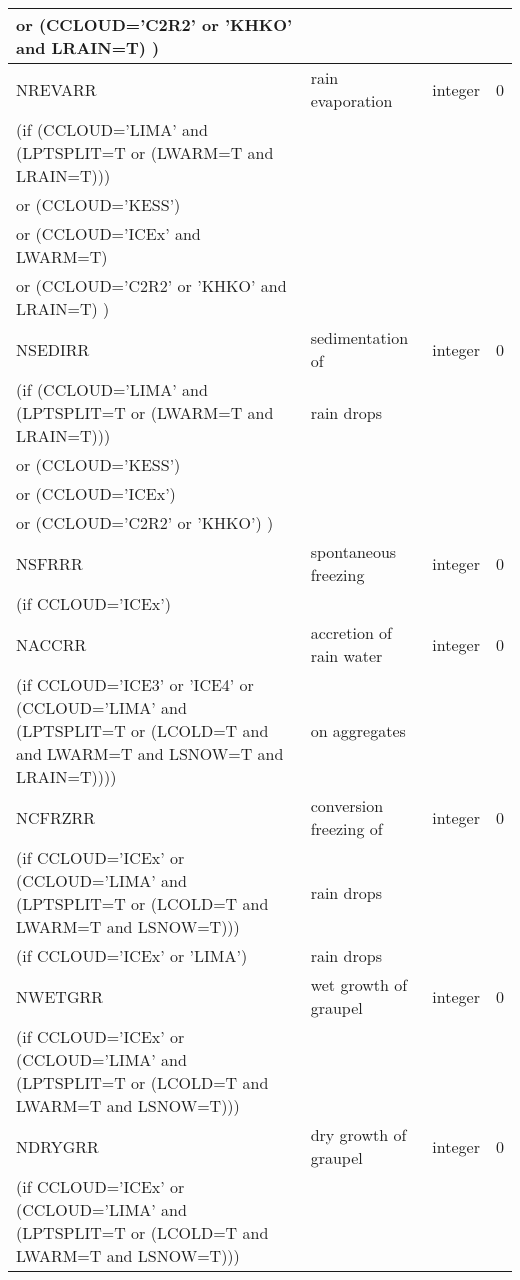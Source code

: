 \begin{longtable} {|p{}|p{}|>{\centering}p{}|p{}<{\centering}|}
 or (CCLOUD='C2R2' or 'KHKO' and LRAIN=T) ) & & & \\ \hline
NREVARR & rain evaporation  & integer  &  0 \index{NREVARR!\innam{NAM\_BU\_RRR}}\\\hline
(if (CCLOUD='LIMA' and (LPTSPLIT=T or (LWARM=T and LRAIN=T))) & & & \\ \nopagebreak
 or (CCLOUD='KESS') & & & \\ \nopagebreak
 or (CCLOUD='ICEx' and LWARM=T) & & & \\ \nopagebreak
 or (CCLOUD='C2R2' or 'KHKO' and LRAIN=T) ) & & & \\ \hline
NSEDIRR   & sedimentation of & integer  &  0 \index{NSEDIRR!\innam{NAM\_BU\_RRR}}\\ \nopagebreak
(if (CCLOUD='LIMA' and (LPTSPLIT=T or (LWARM=T and LRAIN=T))) & rain drops & & \\ \nopagebreak
 or (CCLOUD='KESS') & & & \\ \nopagebreak
 or (CCLOUD='ICEx') & & & \\ \nopagebreak
 or (CCLOUD='C2R2' or 'KHKO') ) & & & \\ \hline
NSFRRR   & spontaneous freezing & integer  &  0 \index{NSFRRR!\innam{NAM\_BU\_RRR}}\\ \nopagebreak
(if CCLOUD='ICEx') & &   &  \\\hline
NACCRR   & accretion of rain water & integer  &  0 \index{NACCRR!\innam{NAM\_BU\_RRR}}\\ \nopagebreak
(if CCLOUD='ICE3' or 'ICE4' or (CCLOUD='LIMA' and (LPTSPLIT=T or (LCOLD=T and and LWARM=T and LSNOW=T and LRAIN=T)))) & on aggregates & & \\\hline
NCFRZRR  & conversion freezing of & integer  &  0 \index{NCFRZRR!\innam{NAM\_BU\_RRR}}\\ \nopagebreak
(if CCLOUD='ICEx' or (CCLOUD='LIMA' and (LPTSPLIT=T or (LCOLD=T and LWARM=T and LSNOW=T))) & rain drops & & \\\hline
(if CCLOUD='ICEx' or 'LIMA') & rain drops &   &  \\\hline
NWETGRR  & wet growth of graupel & integer  &  0 \index{NWETGRR!\innam{NAM\_BU\_RRR}}\\ \nopagebreak
(if CCLOUD='ICEx' or (CCLOUD='LIMA' and (LPTSPLIT=T or (LCOLD=T and LWARM=T and LSNOW=T))) & & & \\\hline
NDRYGRR  & dry growth of graupel & integer  &  0 \index{NDRYGRR!\innam{NAM\_BU\_RRR}}\\ \nopagebreak
(if CCLOUD='ICEx' or (CCLOUD='LIMA' and (LPTSPLIT=T or (LCOLD=T and LWARM=T and LSNOW=T))) & & & \\\hline

\end{longtable}
